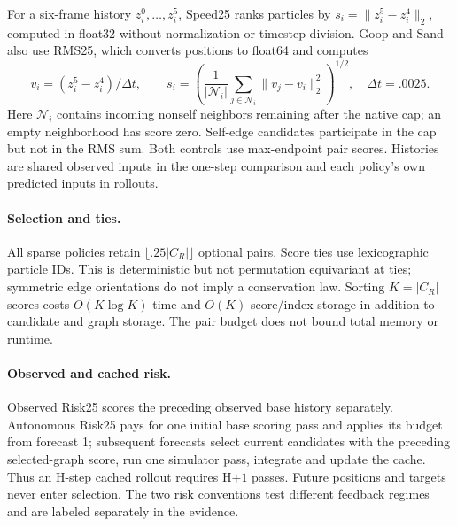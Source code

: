 For a six-frame history $z_i^0,\ldots,z_i^5$, Speed25 ranks particles by $s_i=\|z_i^5-z_i^4\|_2$, computed in float32 without normalization or timestep division. Goop and Sand also use RMS25, which converts positions to float64 and computes
\begin{equation}
 v_i=(z_i^5-z_i^4)/\Delta t,\qquad
 s_i=\left(\frac{1}{|\mathcal N_i|}\sum_{j\in\mathcal N_i}\|v_j-v_i\|_2^2\right)^{1/2},
 \quad \Delta t=.0025.
\end{equation}
Here $\mathcal N_i$ contains incoming nonself neighbors remaining after the native cap; an empty neighborhood has score zero. Self-edge candidates participate in the cap but not in the RMS sum. Both controls use max-endpoint pair scores. Histories are shared observed inputs in the one-step comparison and each policy's own predicted inputs in rollouts.

\paragraph{Selection and ties.}\label{sec:tie-symmetry}
All sparse policies retain $\lfloor .25|C_R|\rfloor$ optional pairs. Score ties use lexicographic particle IDs. This is deterministic but not permutation equivariant at ties; symmetric edge orientations do not imply a conservation law. Sorting $K=|C_R|$ scores costs $O(K\log K)$ time and $O(K)$ score/index storage in addition to candidate and graph storage. The pair budget does not bound total memory or runtime.

\paragraph{Observed and cached risk.}
Observed Risk25 scores the preceding observed base history separately. Autonomous Risk25 pays for one initial base scoring pass and applies its budget from forecast 1; subsequent forecasts select current candidates with the preceding selected-graph score, run one simulator pass, integrate and update the cache. Thus an H-step cached rollout requires H$+1$ passes. Future positions and targets never enter selection. The two risk conventions test different feedback regimes and are labeled separately in the evidence.

